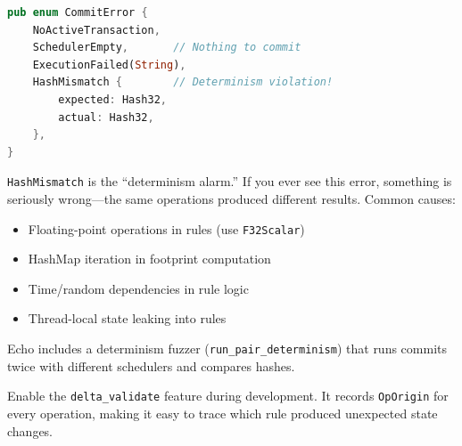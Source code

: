 \begin{lstlisting}[language=Rust]
pub enum CommitError {
    NoActiveTransaction,
    SchedulerEmpty,       // Nothing to commit
    ExecutionFailed(String),
    HashMismatch {        // Determinism violation!
        expected: Hash32,
        actual: Hash32,
    },
}
\end{lstlisting}

\begin{watchout}
\texttt{HashMismatch} is the ``determinism alarm.'' If you ever see this error, something is seriously wrong---the same operations produced different results. Common causes:

\begin{itemize}
    \item Floating-point operations in rules (use \texttt{F32Scalar})
    \item HashMap iteration in footprint computation
    \item Time/random dependencies in rule logic
    \item Thread-local state leaking into rules
\end{itemize}

Echo includes a determinism fuzzer (\texttt{run\_pair\_determinism}) that runs commits twice with different schedulers and compares hashes.
\end{watchout}

\begin{protip}
Enable the \texttt{delta\_validate} feature during development. It records \texttt{OpOrigin} for every operation, making it easy to trace which rule produced unexpected state changes.
\end{protip}
